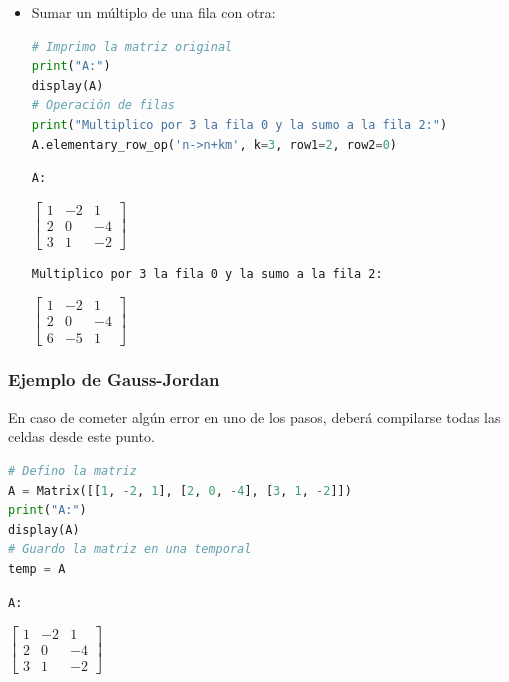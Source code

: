 \documentclass[a4,11pt]{aleph-notas}
\begin{document}
\begin{itemize}
\item
    Sumar un múltiplo de una fila con otra:
\begin{pycodigo}
    \begin{ipynbcodigo}\begin{lstlisting}[language=Python]
# Imprimo la matriz original
print("A:")
display(A)
# Operación de filas
print("Multiplico por 3 la fila 0 y la sumo a la fila 2:")
A.elementary_row_op('n->n+km', k=3, row1=2, row2=0)
    \end{lstlisting}\end{ipynbcodigo}
    \begin{ipynbsalida}
    \begin{Verbatim}
A:
    \end{Verbatim}
    $\displaystyle \left[\begin{matrix}1 & -2 & 1\\2 & 0 & -4\\3 & 1 & -2\end{matrix}\right]$
    \begin{Verbatim}
Multiplico por 3 la fila 0 y la sumo a la fila 2:
    \end{Verbatim}
    $\displaystyle \left[\begin{matrix}1 & -2 & 1\\2 & 0 & -4\\6 & -5 & 1\end{matrix}\right]$
    \end{ipynbsalida}
\end{pycodigo}

\end{itemize}

\subsubsection{Ejemplo de Gauss-Jordan}

En caso de cometer algún error en uno de los pasos, deberá compilarse todas las celdas desde este punto.

\begin{pycodigo}
    \begin{ipynbcodigo}\begin{lstlisting}[language=Python]
# Defino la matriz
A = Matrix([[1, -2, 1], [2, 0, -4], [3, 1, -2]])
print("A:")
display(A)
# Guardo la matriz en una temporal
temp = A
    \end{lstlisting}\end{ipynbcodigo}
    \begin{ipynbsalida}
    \begin{Verbatim}
A:
    \end{Verbatim}
    $\displaystyle \left[\begin{matrix}1 & -2 & 1\\2 & 0 & -4\\3 & 1 & -2\end{matrix}\right]$
    \end{ipynbsalida}
\end{pycodigo}
\end{document}
